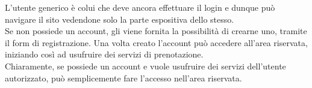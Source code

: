 L'utente generico è colui che deve ancora effettuare il login e dunque può navigare il sito vedendone solo la parte espositiva dello stesso.\\
Se non possiede un account, gli viene fornita la possibilità di crearne uno, tramite il form di registrazione. Una volta creato l'account può accedere all'area riservata, iniziando così ad usufruire dei servizi di prenotazione.\\
Chiaramente, se possiede un account e vuole usufruire dei servizi dell'utente autorizzato, può semplicemente fare l'accesso nell'area riservata. 